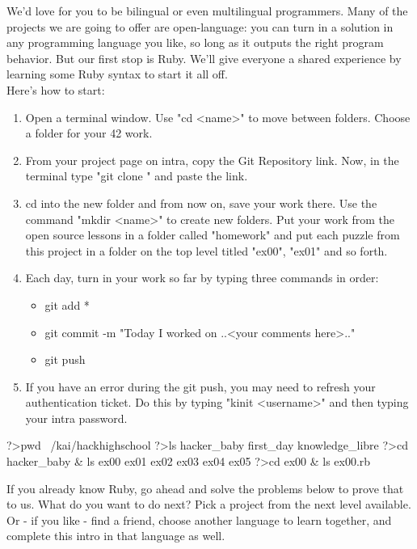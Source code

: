 \documentclass{42-en}
\begin{document}
We'd love for you to be bilingual or even multilingual programmers. Many of the projects we are going to offer are
open-language: you can turn in a solution in any programming language you like, so long as it outputs the right
program behavior. But our first stop is Ruby. We'll give everyone a shared experience by learning some Ruby syntax
to start it all off.\\

Here's how to start:
\begin{enumerate}

	\item Open a terminal window. Use "cd <name>" to move between folders. Choose a folder for your 42 work.
	\item From your project page on intra, copy the Git Repository link. Now, in the terminal type "git clone " and paste the link.
	\item cd into the new folder and from now on, save your work there. Use the command "mkdir <name>" to create new folders. Put your work from the
	open source lessons in a folder called "homework" and put each puzzle from this project in a folder on the top level titled "ex00", "ex01" and so forth. 
	\item Each day, turn in your work so far by typing three commands in order: 
	\begin{itemize}
		\item git add *
		\item git commit -m "Today I worked on ..<your comments here>.."
		\item git push
	\end{itemize}
	\item If you have an error during the git push, you may need to refresh your authentication ticket. Do this by typing "kinit <username>" and then typing your intra password.

\end{enumerate}

\begin{42console}
	?>pwd
	~/kai/hackhighschool
	?>ls
	hacker_baby
	first_day
	knowledge_libre
	?>cd hacker_baby & ls
	ex00
	ex01
	ex02
	ex03
	ex04
	ex05
	?>cd ex00 & ls
	ex00.rb
\end{42console}

If you already know Ruby, go ahead and solve the problems below to prove that to us. What do you want to do next? Pick a project from
the next level available. Or - if you like - find a friend, choose another language to learn together, and complete this intro in that language as well. 
\end{document}
